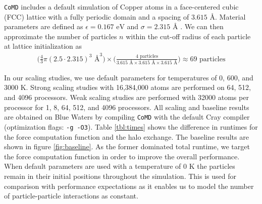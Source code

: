 \documentclass[12pt]{article}
\begin{document}
\texttt{CoMD} includes a default simulation of Copper atoms in a
face-centered cubic (FCC) lattice with a fully periodic domain and a
spacing of $3.615 \text{ \AA}$.  Material parameters are defined as
$\epsilon = 0.167 \text{ eV}$ and $\sigma = 2.315 \text{ \AA}$
\cite{CoMD}. We can then approximate the number of particles $n$
within the cut-off radius of each particle at lattice initialization
as
\begin{align}
     \bigg( \frac{4}{3} \pi (2.5 \cdot 2.315)^3 \text{ \AA}^3 \bigg) \times
     \bigg( \frac{4 \text{ particles}}{3.615 \text{ \AA} \times 3.615 \text{ \AA} \times 3.615 \text{ \AA}} \bigg)
     \approx 69 \text{ particles}
\end{align}

In our scaling studies, we use default parameters for temperatures of
0, 600, and 3000 K. Strong scaling studies with 16,384,000 atoms are
performed on 64, 512, and 4096 processors. Weak scaling studies are
performed with 32000 atoms per processor for 1, 8, 64, 512, and 4096
processors.  All scaling and baseline results are obtained on Blue
Waters by compiling \texttt{CoMD} with the default Cray compiler
(optimization flags: \texttt{-g -O3}). Table \ref{tbl:times} shows the
difference in runtimes for the force computation function and the halo
exchange. The baseline results are shown in figure
\ref{fig:baseline}. As the former dominated total runtime, we target
the force computation function in order to improve the overall
performance. When default parameters are used with a temperature of 0
K the particles remain in their initial positions throughout the
simulation. This is used for comparison with performance expectations
as it enables us to model the number of particle-particle interactions
as constant.
\\
\end{document}
